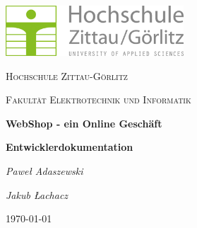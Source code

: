 \documentclass[a4paper,12pt]{article}
\begin{document}
\begin{titlepage}
	\centering
	\includegraphics[width=0.5\textwidth]{Bilder/hszglogo.png}\par\vspace{1cm}
	{\scshape\LARGE Hochschule Zittau-Görlitz \par}
	{\scshape\Large Fakultät Elektrotechnik und Informatik\par}
	\vspace{5cm}
	{\huge\bfseries WebShop - ein Online Geschäft\par}
	{\LARGE\bfseries Entwicklerdokumentation\par}

	\vspace{5cm}
	{\Large\itshape Paweł Adaszewski\par}
	{\Large\itshape Jakub Łachacz\par}


	\vfill

	{\large \today\par}
\end{titlepage}
\end{document}
